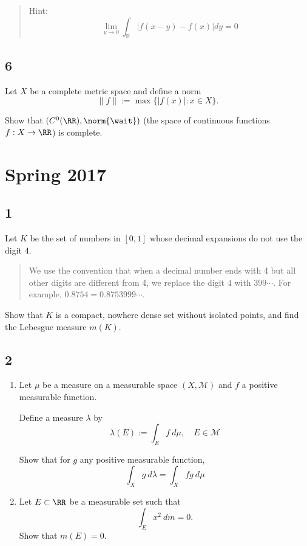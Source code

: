 \begin{quote}
Hint: \[
\lim _{y \rightarrow 0} \int_{\mathbb{R}}|f(x-y)-f(x)| d y=0
\]
\end{quote}

\hypertarget{section-5}{%
\subsection{6}\label{section-5}}

Let \(X\) be a complete metric space and define a norm \[
\|f\|:=\max \{|f(x)|: x \in X\}.
\]

Show that \((C^0(\RR), \norm{\wait} )\) (the space of continuous
functions \(f: X\to \RR\)) is complete.

\hypertarget{spring-2017}{%
\section{Spring 2017}\label{spring-2017}}

\hypertarget{section}{%
\subsection{1}\label{section}}

Let \(K\) be the set of numbers in \([0, 1]\) whose decimal expansions
do not use the digit \(4\).

\begin{quote}
We use the convention that when a decimal number ends with 4 but all
other digits are different from 4, we replace the digit \(4\) with
\(399\cdots\). For example, \(0.8754 = 0.8753999\cdots\).
\end{quote}

Show that \(K\) is a compact, nowhere dense set without isolated points,
and find the Lebesgue measure \(m(K)\).

\hypertarget{section-1}{%
\subsection{2}\label{section-1}}

\begin{enumerate}
\def\labelenumi{\alph{enumi}.}
\item
  Let \(\mu\) be a measure on a measurable space \((X, \mathcal M)\) and
  \(f\) a positive measurable function.

  Define a measure \(\lambda\) by \[
  \lambda(E):=\int_{E} f ~d \mu, \quad E \in \mathcal{M}
  \]

  Show that for \(g\) any positive measurable function, \[
  \int_{X} g ~d \lambda=\int_{X} f g ~d \mu
  \]
\item
  Let \(E \subset \RR\) be a measurable set such that \[
  \int_{E} x^{2} ~d m=0.
  \] Show that \(m(E) = 0\).
\end{enumerate}

